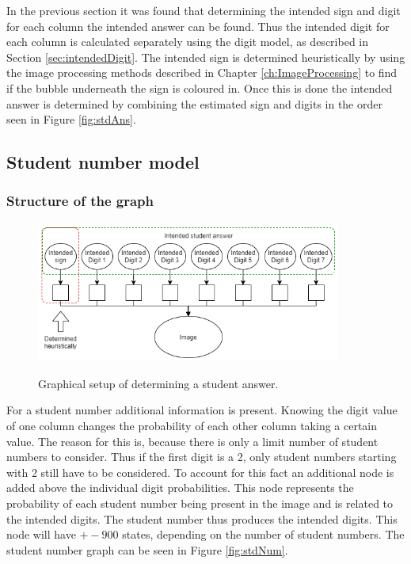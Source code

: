 In the previous section it was found that determining the intended sign and digit for each column the intended answer can be found. Thus the intended digit for each column is calculated separately using the digit model, as described in Section \ref{sec:intendedDigit}. The intended sign is determined heuristically by using the image processing methods described in Chapter \ref{ch:ImageProcessing} to find if the bubble underneath the sign is coloured in. Once this is done the intended answer is determined by combining the estimated sign and digits in the order seen in Figure \ref{fig:stdAns}.

\subsection{Student number model}
\label{sec:pgmStudentNum}

\subsubsection{Structure of the graph}

\begin{figure}
  \centering
  \includegraphics[width=10cm]{ans}\\
  \caption{Graphical setup of determining a student answer.}
  \label{fig:ans}
\end{figure}

For a student number additional information is present. Knowing the digit value of one column changes the probability of each other column taking a certain value. The reason for this is, because there is only a limit number of student numbers to consider. Thus if the first digit is a 2, only student numbers starting with 2 still have to be considered. To account for this fact an additional node is added above the individual digit probabilities. This node represents the probability of each student number being present in the image and is related to the intended digits. The student number thus produces the intended digits. This node will have $+- 900$ states, depending on the number of student numbers. The student number graph can be seen in Figure \ref{fig:stdNum}.


